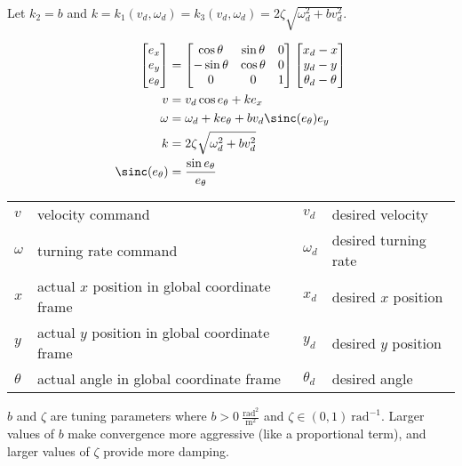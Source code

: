 Let $k_2 = b$ and
$k = k_1(v_d, \omega_d) = k_3(v_d, \omega_d) = 2\zeta\sqrt{\omega_d^2 + bv_d^2}$.
\begin{theorem}
  \begin{align}
    \begin{bmatrix}
      e_x \\
      e_y \\
      e_\theta
    \end{bmatrix} &=
    \begin{bmatrix}
      \cos\theta & \sin\theta & 0 \\
      -\sin\theta & \cos\theta & 0 \\
      0 & 0 & 1
    \end{bmatrix}
    \begin{bmatrix}
      x_d - x \\
      y_d - y \\
      \theta_d - \theta
    \end{bmatrix} \\
    v &= v_d \cos{e_\theta} + k e_x \label{eq:ramsete_eq1} \\
    \omega &= \omega_d + k e_\theta + b v_d \sinc(e_\theta) e_y
      \label{eq:ramsete_eq2} \\
    k &= 2\zeta\sqrt{\omega_d^2 + bv_d^2} \label{eq:ramsete_eq3} \\
    \sinc(e_\theta) &= \frac{\sin{e_\theta}}{e_\theta}
  \end{align}
  \begin{figurekey}
    \begin{tabular}{llll}
      $v$ & velocity command & $v_d$ & desired velocity \\
      $\omega$ & turning rate command & $\omega_d$ & desired turning rate \\
      $x$ & actual $x$ position in global coordinate frame & $x_d$ &
        desired $x$ position \\
      $y$ & actual $y$ position in global coordinate frame & $y_d$ &
        desired $y$ position \\
      $\theta$ & actual angle in global coordinate frame & $\theta_d$ &
        desired angle
    \end{tabular}
  \end{figurekey}

  $b$ and $\zeta$ are tuning parameters where
  $b > 0~\frac{\text{rad}^2}{\text{m}^2}$ and
  $\zeta \in (0, 1)~\text{rad}^{-1}$. Larger values of $b$ make convergence more
  aggressive (like a proportional term), and larger values of $\zeta$ provide
  more damping.
\end{theorem}

